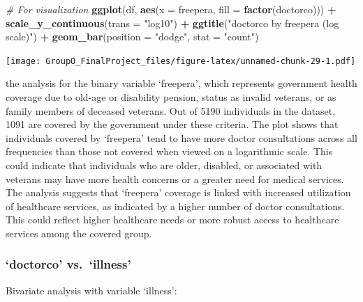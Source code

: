 \documentclass[
]{article}
\newenvironment{Shaded}{\begin{snugshade}}{\end{snugshade}}
\newcommand{\AttributeTok}[1]{\textcolor[rgb]{0.13,0.29,0.53}{#1}}
\newcommand{\CommentTok}[1]{\textcolor[rgb]{0.56,0.35,0.01}{\textit{#1}}}
\newcommand{\FunctionTok}[1]{\textcolor[rgb]{0.13,0.29,0.53}{\textbf{#1}}}
\newcommand{\NormalTok}[1]{#1}
\newcommand{\SpecialCharTok}[1]{\textcolor[rgb]{0.81,0.36,0.00}{\textbf{#1}}}
\newcommand{\StringTok}[1]{\textcolor[rgb]{0.31,0.60,0.02}{#1}}
\begin{document}
\begin{Shaded}
\begin{Highlighting}[]
\CommentTok{\# For visualization}
\FunctionTok{ggplot}\NormalTok{(df, }\FunctionTok{aes}\NormalTok{(}\AttributeTok{x =}\NormalTok{ freepera, }\AttributeTok{fill =} \FunctionTok{factor}\NormalTok{(doctorco))) }\SpecialCharTok{+} 
  \FunctionTok{scale\_y\_continuous}\NormalTok{(}\AttributeTok{trans =} \StringTok{"log10"}\NormalTok{) }\SpecialCharTok{+}
  \FunctionTok{ggtitle}\NormalTok{(}\StringTok{"\textquotesingle{}doctorco\textquotesingle{} by \textquotesingle{}freepera\textquotesingle{} (log scale)"}\NormalTok{) }\SpecialCharTok{+}
  \FunctionTok{geom\_bar}\NormalTok{(}\AttributeTok{position =} \StringTok{"dodge"}\NormalTok{, }\AttributeTok{stat =} \StringTok{"count"}\NormalTok{)}
\end{Highlighting}
\end{Shaded}

\texttt{[image: GroupO\_FinalProject\_files/figure-latex/unnamed-chunk-29-1.pdf]}

the analysis for the binary variable `freepera', which represents
government health coverage due to old-age or disability pension, status
as invalid veterans, or as family members of deceased veterans. Out of
5190 individuals in the dataset, 1091 are covered by the government
under these criteria. The plot shows that individuals covered by
`freepera' tend to have more doctor consultations across all frequencies
than those not covered when viewed on a logarithmic scale. This could
indicate that individuals who are older, disabled, or associated with
veterans may have more health concerns or a greater need for medical
services. The analysis suggests that `freepera' coverage is linked with
increased utilization of healthcare services, as indicated by a higher
number of doctor consultations. This could reflect higher healthcare
needs or more robust access to healthcare services among the covered
group.

\subsubsection{`doctorco' vs.~`illness'}\label{doctorco-vs.-illness}

Bivariate analysis with variable `illness':

\begin{Shaded}
\end{Shaded}
\end{document}
